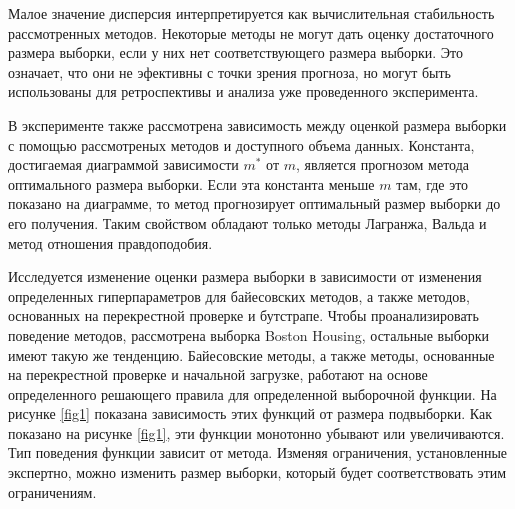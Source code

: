 Малое значение дисперсия интерпретируется как вычислительная стабильность рассмотренных методов. Некоторые методы не могут дать оценку достаточного размера выборки, если у них нет соответствующего размера выборки. Это означает, что они не эфективны с точки зрения прогноза, но могут быть использованы для ретроспективы и анализа уже проведенного эксперимента.

В эксперименте также рассмотрена зависимость между оценкой размера выборки с помощью рассмотреных методов и доступного объема данных. Константа, достигаемая диаграммой зависимости $m^*$ от $m$, является прогнозом метода оптимального размера выборки. Если эта константа меньше $m$ там, где это показано на диаграмме, то метод прогнозирует оптимальный размер выборки до его получения. Таким свойством обладают только методы Лагранжа, Вальда и метод отношения правдоподобия.

Исследуется изменение оценки размера выборки в зависимости от изменения определенных гиперпараметров для байесовских методов, а также методов, основанных на перекрестной проверке и бутстрапе. Чтобы проанализировать поведение методов, рассмотрена выборка {Boston Housing}, остальные выборки имеют такую же тенденцию.
Байесовские методы, а также методы, основанные на перекрестной проверке и начальной загрузке, работают на основе определенного решающего правила для определенной выборочной функции. На рисунке \ref{fig1} показана зависимость этих функций от размера подвыборки. Как показано на рисунке \ref{fig1}, эти функции монотонно убывают или увеличиваются. Тип поведения функции зависит от метода. Изменяя ограничения, установленные экспертно, можно изменить размер выборки, который будет соответствовать этим ограничениям.
